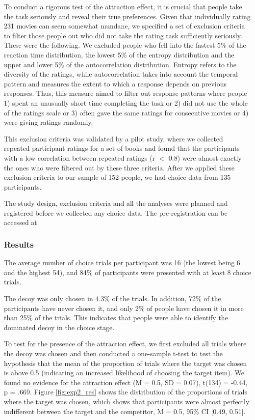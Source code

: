 \documentclass[12pt, a4paper]{article}
\begin{document}
To conduct a rigorous test of the attraction effect, it is crucial that people take the task seriously and reveal their true preferences. Given that individually rating 231 movies can seem somewhat mundane, we specified a set of exclusion criteria to filter those people out who did not take the rating task sufficiently seriously. These were the following. We excluded people who fell into the fastest 5\% of the reaction time distribution, the lowest 5\% of the entropy distribution and the upper and lower 5\% of the autocorrelation distribution. Entropy refers to the diversity of the ratings, while autocorrelation takes into account the temporal pattern and measures the extent to which a response depends on previous responses. Thus, this measure aimed to filter out response patterns where people 1) spent an unusually short time completing the task or 2) did not use the whole of the ratings scale or 3) often gave the same ratings for consecutive movies or 4) were giving ratings randomly.

This exclusion criteria was validated by a pilot study, where we collected repeated participant ratings for a set of books and found that the participants with a low correlation between repeated ratings (r $<$ 0.8) were almost exactly the ones who were filtered out by these three criteria. After we applied these exclusion criteria to our sample of 152 people, we had choice data from 135 participants.

The study design, exclusion criteria and all the analyses were planned and registered before we collected any choice data. The pre-registration can be accessed at

\subsubsection{Results}

The average number of choice trials per participant was 16 (the lowest being 6 and the highest 54), and 84\% of participants were presented with at least 8 choice trials.

The decoy was only chosen in 4.3\% of the trials. In addition, 72\% of the participants have never chosen it, and only 2\% of people have chosen it in more than 25\% of the trials. This indicates that people were able to identify the dominated decoy in the choice stage. 

To test for the presence of the attraction effect, we first excluded all trials where the decoy was chosen and then conducted a one-sample t-test to test the hypothesis that the mean of the proportion of trials where the target was chosen is above 0.5 (indicating an increased likelihood of choosing the target item). We found no evidence for the attraction effect (M = 0.5, SD = 0.07), t(134) = -0.44, p = .669. Figure \ref{fig:exp2_res} shows the distribution of the proportions of trials where the target was chosen, which shows that participants were almost perfectly indifferent between the target and the competitor, M = 0.5, 95\% CI [0.49, 0.51].
\end{document}

